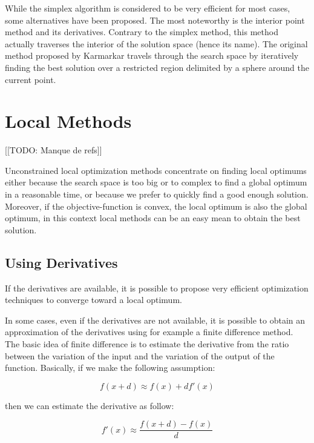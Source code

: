 While the simplex algorithm is considered to be very efficient for most cases, some alternatives have been proposed. The most noteworthy is the interior point method and its derivatives. Contrary to the simplex method, this method actually traverses the interior of the solution space (hence its name). The original method proposed by Karmarkar\cite{Karmarkar:1984:NPA:800057.808695} travels through the search space by iteratively finding the best solution over a restricted region delimited by a sphere around the current point.

\section{Local Methods}

[[TODO: Manque de refs]]

Unconstrained local optimization methods concentrate on finding local optimums either because the search space is too big or to complex to find a global optimum in a reasonable time, or because we prefer to quickly find a good enough solution.
 Moreover, if the objective-function is convex, the local optimum is also the global optimum, in this context local methods can be an easy mean to obtain the best solution.

\subsection{Using Derivatives}

If the derivatives are available, it is possible to propose very efficient optimization techniques to converge toward a local optimum.

In some cases, even if the derivatives are not available, it is possible to obtain an approximation of the derivatives using for example a finite difference method. The basic idea of finite difference is to estimate the derivative from the ratio between the variation of the input and the variation of the output of the function.
Basically, if we make the following assumption:

\begin{equation*}f(x + d) \approx f(x) +df'(x)\end{equation*}

then we can estimate the derivative as follow:

\begin{equation*}f'(x) \approx \frac{f(x + d)  - f(x)}{d}\end{equation*}

